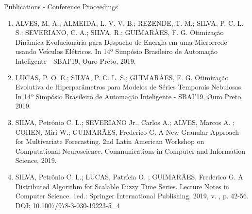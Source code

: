 \documentclass{beamer}
\begin{document}
\begin{frame}{Publications - Conference Proceedings}
\scriptsize
\begin{enumerate}
\item  ALVES, M. A.; ALMEIDA, L. V. V. B.; REZENDE, T. M.; SILVA, P. C. L. S.; SEVERIANO, C. A.; SILVA, R.; GUIMARÃES, F. G. Otimização Dinâmica Evolucionária para Despacho de Energia em uma Microrrede usando Veículos Elétricos. In 14º Simpósio Brasileiro de Automação Inteligente - SBAI'19, Ouro Preto, 2019.
\item  LUCAS, P. O. E.; SILVA, P. C. L. S.; GUIMARÃES, F. G. Otimização Evolutiva de Hiperparâmetros para Modelos de Séries Temporais Nebulosas.  In 14º Simpósio Brasileiro de Automação Inteligente - SBAI'19, Ouro Preto, 2019.
\item SILVA, Petrônio C. L.; SEVERIANO Jr., Carlos A.; ALVES, Marcos A. ; COHEN, Miri W.; GUIMARÃES, Frederico G. A New Granular Approach for Multivariate Forecasting. 2nd Latin American Workshop on Computational Neuroscience. Communications in Computer and Information Science, 2019.
\item SILVA, Petrônio C. L.; LUCAS, Patrícia O. ; GUIMARÃES, Frederico G. A Distributed Algorithm for Scalable Fuzzy Time Series. Lecture Notes in Computer Science. 1ed.: Springer International Publishing, 2019, v. , p. 42-56. DOI: 10.1007/978-3-030-19223-5\_4
\end{enumerate}
\end{frame}
\end{document}
